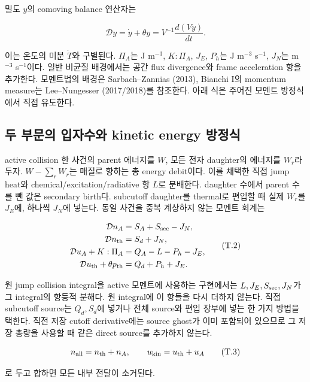 \documentclass[11pt,a4paper]{article}
\begin{document}
밀도 \(y\)의 comoving balance 연산자는

\[
\mathcal D y=\dot y+\theta y=V^{-1}\frac{d(Vy)}{dt}.
\tag{T.1}
\]

이는 온도의 미분 \(\dot T\)와 구별된다. \(\Pi_A\)는 J m\(^{-3}\), \(K:\Pi_A\), \(J_E\), \(P_h\)는 J m\(^{-3}\) s\(^{-1}\), \(J_N\)는 m\(^{-3}\) s\(^{-1}\)이다. 일반 비균질 배경에서는 공간 flux divergence와 frame acceleration 항을 추가한다. 모멘트법의 배경은 Sarbach--Zannias (2013), Bianchi I의 momentum measure는 Lee--Nungesser (2017/2018)를 참조한다. 아래 식은 주어진 모멘트 방정식에서 직접 유도한다.

\hypertarget{uxb450-uxbd80uxbb38uxc758-uxc785uxc790uxc218uxc640-kinetic-energy-uxbc29uxc815uxc2dd}{%
\subsection{두 부문의 입자수와 kinetic energy 방정식}\label{uxb450-uxbd80uxbb38uxc758-uxc785uxc790uxc218uxc640-kinetic-energy-uxbc29uxc815uxc2dd}}

active collision 한 사건의 parent 에너지를 \(W\), 모든 전자 daughter의 에너지를 \(W_r\)라 두자. \(W-\sum_rW_r\)는 매질로 향하는 총 energy debit이다. 이를 채택한 직접 jump heat와 chemical/excitation/radiative 항 \(L\)로 분배한다. daughter 수에서 parent 수를 뺀 값은 secondary birth다. subcutoff daughter를 thermal로 편입할 때 실제 \(W_r\)를 \(J_E\)에, 하나씩 \(J_N\)에 넣는다. 동일 사건을 중복 계상하지 않는 모멘트 회계는

\[
\begin{aligned}
\mathcal D n_A &= S_A+S_{\rm sec}-J_N,\\
\mathcal D n_{\rm th} &= S_d+J_N,\\
\mathcal D u_A+K:\Pi_A &= Q_A-L-P_h-J_E,\\
\mathcal D u_{\rm th}+\theta p_{\rm th} &= Q_d+P_h+J_E.
\end{aligned}
\tag{T.2}
\]

원 jump collision integral을 active 모멘트에 사용하는 구현에서는 \(L,J_E,S_{\rm sec},J_N\)가 그 integral의 항등적 분해다. 원 integral에 이 항들을 다시 더하지 않는다. 직접 subcutoff source는 \(Q_d,S_d\)에 넣거나 전체 source와 편입 장부에 넣는 한 가지 방법을 택한다. 직전 저장 cutoff derivative에는 source ghost가 이미 포함되어 있으므로 그 저장 총량을 사용할 때 같은 direct source를 추가하지 않는다.

\[
n_{\rm all}=n_{\rm th}+n_A,\qquad u_{\rm kin}=u_{\rm th}+u_A
\tag{T.3}
\]

로 두고 합하면 모든 내부 전달이 소거된다.
\end{document}
